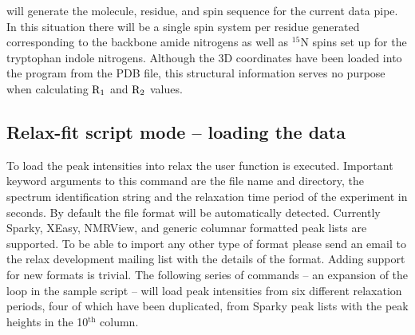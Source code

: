 will generate the molecule, residue, and spin sequence for the current data pipe.  In this situation there will be a single spin system per residue generated corresponding to the backbone amide nitrogens as well as $^{15}$N spins set up for the tryptophan indole nitrogens.  Although the 3D coordinates have been loaded into the program from the PDB file, this structural information serves no purpose when calculating $\mathrm{R}_1$ and $\mathrm{R}_2$ values.



\subsection{Relax-fit script mode -- loading the data}

To load the peak intensities into relax the user function  is executed.  Important keyword arguments to this command are the file name and directory, the spectrum identification string and the relaxation time period of the experiment in seconds.  By default the file format will be automatically detected.  Currently Sparky, XEasy, NMRView, and generic columnar formatted peak lists are supported.  To be able to import any other type of format please send an email to the relax development mailing list with the details of the format.  Adding support for new formats is trivial.  The following series of commands -- an expansion of the  loop in the sample script -- will load peak intensities from six different relaxation periods, four of which have been duplicated, from Sparky peak lists with the peak heights in the 10$^\textrm{th}$ column.

